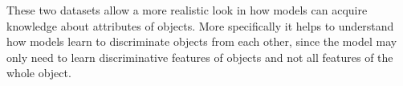 These two datasets allow a more realistic look in how models can acquire knowledge about attributes of objects.
More specifically it helps to understand how models learn to discriminate objects from each other, since the model may only need to learn discriminative features of objects and not all features of the whole object.
